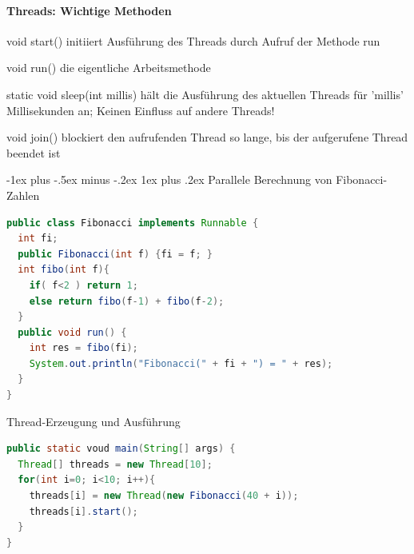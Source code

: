 \documentclass[10pt]{article}
\makeatletter
\renewcommand{\subsubsection}{\@startsection{subsubsection}{3}{0mm}%
                                {-1ex plus -.5ex minus -.2ex}%
                                {1ex plus .2ex}%
                                {\normalfont\small\bfseries}}
\makeatother
\begin{document}
\paragraph{Threads: Wichtige Methoden}

\begin{description*}
  \item[void start()] initiiert Ausführung des Threads durch Aufruf der Methode run
  \item[void run()] die eigentliche Arbeitsmethode
  \item[static void sleep(int millis)] hält die Ausführung des aktuellen Threads für 'millis' Millisekunden an; Keinen Einfluss auf andere Threads!
  \item[void join()] blockiert den aufrufenden Thread so lange, bis der aufgerufene Thread beendet ist
\end{description*}

\subsubsection{Parallele Berechnung von Fibonacci-Zahlen}
\begin{lstlisting}[language=java]
public class Fibonacci implements Runnable {
  int fi;
  public Fibonacci(int f) {fi = f; }
  int fibo(int f){
    if( f<2 ) return 1;
    else return fibo(f-1) + fibo(f-2);
  }
  public void run() {
    int res = fibo(fi);
    System.out.println("Fibonacci(" + fi + ") = " + res);
  }
}
\end{lstlisting}

Thread-Erzeugung und Ausführung
\begin{lstlisting}[language=java]
public static voud main(String[] args) {
  Thread[] threads = new Thread[10];
  for(int i=0; i<10; i++){
    threads[i] = new Thread(new Fibonacci(40 + i));
    threads[i].start();
  }
}
\end{lstlisting}
\end{document}
